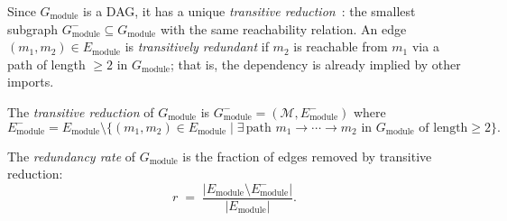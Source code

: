 Since $G_{\mathrm{module}}$ is a DAG, it has a unique \emph{transitive reduction}~\cite{ahu1972}: the smallest subgraph $G_{\mathrm{module}}^{-} \subseteq G_{\mathrm{module}}$ with the same reachability relation. An edge $(m_1, m_2) \in E_{\mathrm{module}}$ is \emph{transitively redundant} if $m_2$ is reachable from $m_1$ via a path of length $\ge 2$ in $G_{\mathrm{module}}$; that is, the dependency is already implied by other imports.

\begin{definition}\label{def:transitive-reduction}
The \emph{transitive reduction} of $G_{\mathrm{module}}$ is $G_{\mathrm{module}}^{-} = (\mathcal{M}, E_{\mathrm{module}}^{-})$ where
\[
  E_{\mathrm{module}}^{-} = E_{\mathrm{module}} \setminus \{(m_1, m_2)\in E_{\mathrm{module}} \mid \exists\, \text{path } m_1 \to \cdots \to m_2 \text{ in } G_{\mathrm{module}} \text{ of length} \ge 2\}.
\]
\end{definition}

\begin{definition}
\label{def:redundancy-rate}
The \emph{redundancy rate} of $G_{\mathrm{module}}$ is the fraction of edges removed by transitive reduction:
\[
  r \;=\; \frac{|E_{\mathrm{module}} \setminus E_{\mathrm{module}}^{-}|}{|E_{\mathrm{module}}|}.
\]
\end{definition}

